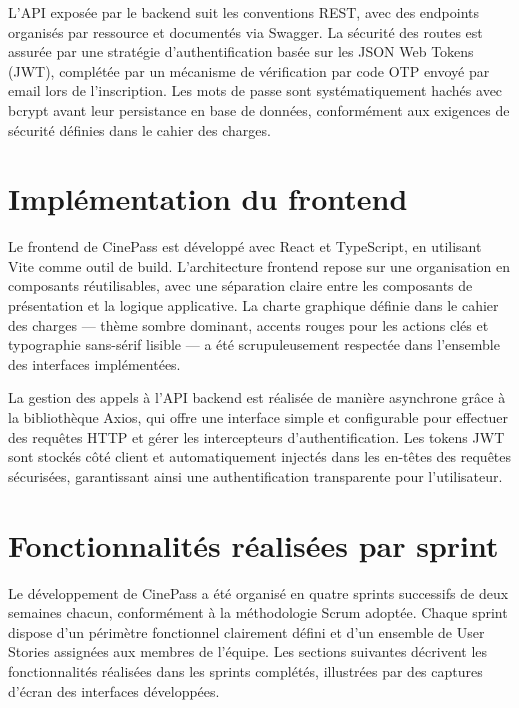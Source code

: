 \documentclass[12pt]{report}
\begin{document}
L'API exposée par le backend suit les conventions REST, avec des endpoints organisés par ressource et documentés via Swagger. La sécurité des routes est assurée par une stratégie d'authentification basée sur les JSON Web Tokens (JWT), complétée par un mécanisme de vérification par code OTP envoyé par email lors de l'inscription. Les mots de passe sont systématiquement hachés avec bcrypt avant leur persistance en base de données, conformément aux exigences de sécurité définies dans le cahier des charges.

\section{Implémentation du frontend}

Le frontend de CinePass est développé avec React et TypeScript, en utilisant Vite comme outil de build. L'architecture frontend repose sur une organisation en composants réutilisables, avec une séparation claire entre les composants de présentation et la logique applicative. La charte graphique définie dans le cahier des charges — thème sombre dominant, accents rouges pour les actions clés et typographie sans-sérif lisible — a été scrupuleusement respectée dans l'ensemble des interfaces implémentées.

La gestion des appels à l'API backend est réalisée de manière asynchrone grâce à la bibliothèque Axios, qui offre une interface simple et configurable pour effectuer des requêtes HTTP et gérer les intercepteurs d'authentification. Les tokens JWT sont stockés côté client et automatiquement injectés dans les en-têtes des requêtes sécurisées, garantissant ainsi une authentification transparente pour l'utilisateur.

\section{Fonctionnalités réalisées par sprint}

Le développement de CinePass a été organisé en quatre sprints successifs de deux semaines chacun, conformément à la méthodologie Scrum adoptée. Chaque sprint dispose d'un périmètre fonctionnel clairement défini et d'un ensemble de User Stories assignées aux membres de l'équipe. Les sections suivantes décrivent les fonctionnalités réalisées dans les sprints complétés, illustrées par des captures d'écran des interfaces développées.
\end{document}

